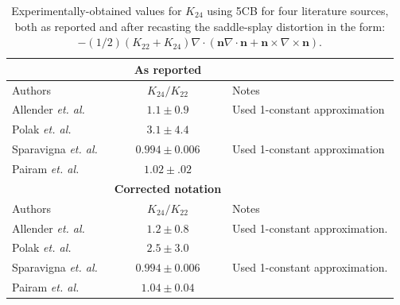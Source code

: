 \begin{table}[t]
  \centering
  \caption{Experimentally-obtained values for $K_{24}$ using 5CB for four literature sources, both as reported and after recasting the saddle-splay distortion in the form: $-(1/2)(K_{22} + K_{24})\nabla \cdot (\mathbf{n}\nabla \cdot \mathbf{n} + \mathbf{n} \times \nabla \times \mathbf{n})$.}
  \begin{tabular}{l c l}
    & {\bf As reported} & \\
    \hline
    Authors & $K_{24}/K_{22}$ & Notes \\
    \hline
    Allender \emph{et. al.}~\cite{allender1991determination} & $1.1 \pm 0.9$ & Used 1-constant approximation\\
    Polak \emph{et. al.}~\cite{polak1994optical} & $3.1 \pm 4.4$ \\
    Sparavigna \emph{et. al.}~\cite{sparavigna1994periodic} & $0.994 \pm 0.006$ & Used 1-constant approximation \\
    Pairam \emph{et. al.}~\cite{RN24} & $1.02 \pm .02$ \\
    & {\bf Corrected notation} & \\
    \hline
    Authors & $K_{24}/K_{22}$ & Notes \\
    \hline
    Allender \emph{et. al.}~\cite{allender1991determination} & $1.2 \pm 0.8$ & Used 1-constant approximation. \\
    Polak \emph{et. al.}~\cite{polak1994optical} & $2.5 \pm 3.0$ \\
    Sparavigna \emph{et. al.}~\cite{sparavigna1994periodic} & $0.994 \pm 0.006$ & Used 1-constant approximation.\\
    Pairam \emph{et. al.}~\cite{RN24} & $1.04 \pm 0.04$ \\
  \end{tabular}
  \label{t:7-K24}
\end{table}


